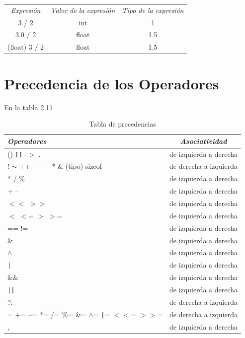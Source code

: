 \begin{table}[!hbp]
\begin{tabular}{c c c}

\em Expresi\'on & \em Valor de la expresi\'on & \em Tipo de la expresi\'on\\
3 / 2 & int & 1 \\
3.0 / 2 & float & 1.5\\
(float) 3 / 2 & float & 1.5\\
\end{tabular}
\end{table}

\section{Precedencia de los Operadores}

\label{precedencia}

En la tabla 2.11

\begin{table}[!hbp]
\begin{tabular}{|l|c|}\hline
\em Operadores & \em Asociatividad\\\hline
\hline
() \texttt{[]} -$>$ . & de izquierda a derecha\\\hline
! $\sim$ ++ \texttt{--} + -- * \& (tipo) sizeof & de derecha a izquierda\\\hline
* / \% & de izquierda a derecha\\\hline
+ -- & de izquierda a derecha\\\hline
$<<$ $>>$ & de izquierda a derecha\\\hline
$<$ $<$= $>$ $>$= & de izquierda a derecha\\\hline
== != & de izquierda a derecha\\\hline
\& & de izquierda a derecha\\\hline
$\land$ & de izquierda a derecha\\\hline
\texttt{|} & de izquierda a derecha\\\hline
\&\& & de izquierda a derecha\\\hline
\texttt{||} & de izquierda a derecha\\\hline
?: & de derecha a izquierda\\\hline
= += --= *= /= \%= \&= $\land$= \texttt{|}= $<<$= $>>$= & de derecha a 
izquierda\\\hline
, & de izquierda a derecha\\\hline

\end{tabular}
\caption{Tabla de precedencias}
\end{table}

